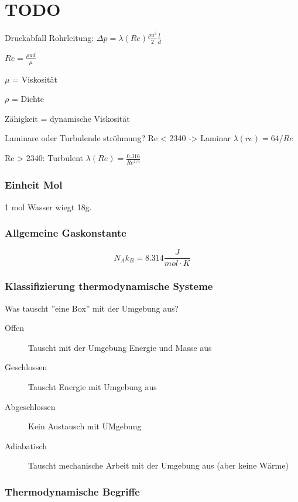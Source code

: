 \documentclass[a4paper]{scrartcl}
\begin{document}
\section{TODO}


Druckabfall Rohrleitung: $\Delta p = \lambda(Re) \frac{\rho u^2}{2}\frac{l}{d}$

$Re = \frac{\rho u d}{\mu}$

$\mu$ = Viskosität

$\rho$ = Dichte

Zähigkeit = dynamische Viskosität


Laminare oder Turbulende ströhmung? 
Re < 2340 -> Laminar
	$\lambda(re) = 64/Re$
	
Re > 2340: Turbulent
	$\lambda(Re) = \frac{0.316}{Re^{1/4}}$

\subsubsection{Einheit Mol}

1 mol Wasser wiegt 18g.

\subsubsection{Allgemeine Gaskonstante}

\[
	N_A k_B = 8.314 \frac{J}{mol \cdot K}
\]

\subsubsection{Klassifizierung thermodynamische Systeme}

Was tauscht ''eine Box'' mit der Umgebung aus?


\begin{description}
	\item[Offen] Tauscht mit der Umgebung Energie und Masse aus
	\item[Geschlossen] Tauscht Energie mit Umgebung aus
	\item[Abgeschlossen] Kein Austausch mit UMgebung
	\item[Adiabatisch] Tauscht mechanische Arbeit mit der Umgebung aus (aber keine Wärme)
\end{description}

\subsubsection{Thermodynamische Begriffe}
\end{document}
